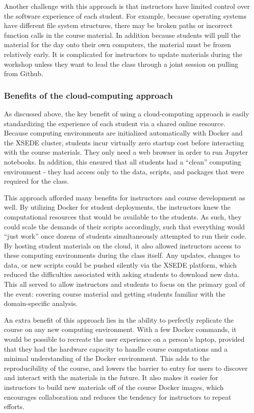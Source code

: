 Another challenge with this approach is that instructors have limited control
over the software experience of each student. For example, because operating
systems have different file system structures, there may be broken paths or
incorrect function calls in the course material. In addition because students
will pull the material for the day onto their own computers, the material must
be frozen relatively early. It is complicated for instructors to update
materials during the workshop unless they want to lead the class through a joint
session on pulling from Github.

\subsubsection{Benefits of the cloud-computing approach}

As discussed above, the key benefit of using a cloud-computing approach is
easily standardizing the experience of each student via a shared online
resource. Because computing environments are initialized automatically with
Docker and the XSEDE cluster, students incur virtually zero startup cost before
interacting with the course materials. They only need a web browser in order to
run Jupyter notebooks.  In
addition, this ensured that all students had a ``clean'' computing environment -
they had access only to the data, scripts, and packages that were required for
the class.

This approach afforded many benefits for instructors and course development as
well. By utilizing Docker for student deployments, the instructors knew the
computational resources that would be available to the students. As such, they
could scale the demands of their scripts accordingly, such that everything would
``just work'' once dozens of students simultaneously attempted to run their
code. By hosting student materials on the cloud, it also allowed instructors
access to these computing environments during the class itself. Any updates,
changes to data, or new scripts could be pushed silently via the XSEDE platform,
which reduced the difficulties associated with asking students to download new
data. This all served to allow instructors and students to focus on the primary
goal of the event: covering course material and getting students familiar with
the domain-specific analysis.

An extra benefit of this approach lies in the ability to perfectly replicate the
course on any new computing environment. With a few Docker commands, it would be
possible to recreate the user experience on a person's laptop, provided that
they had the hardware capacity to handle course computations and a minimal
understanding of the Docker environment. This adds to the reproducibility of the
course, and lowers the barrier to entry for users to discover and interact with
the materials in the future. It also makes it easier for instructors to build
new materials off of the course Docker images, which encourages collaboration
and reduces the tendency for instructors to repeat efforts.

